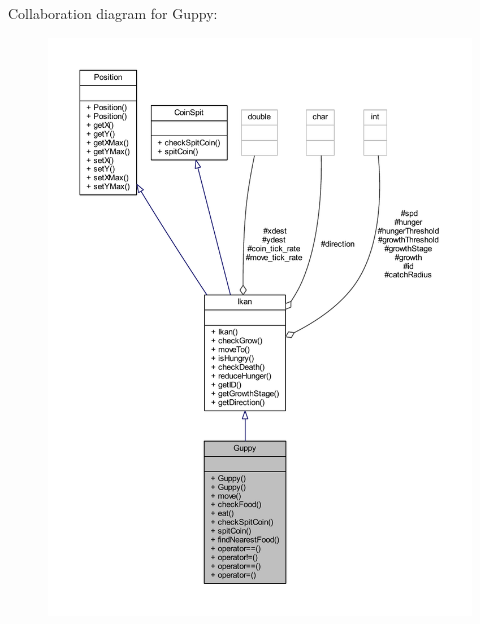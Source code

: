 Collaboration diagram for Guppy\+:
\nopagebreak
\begin{figure}[H]
\begin{center}
\leavevmode
\includegraphics[width=350pt]{class_guppy__coll__graph}
\end{center}
\end{figure}

